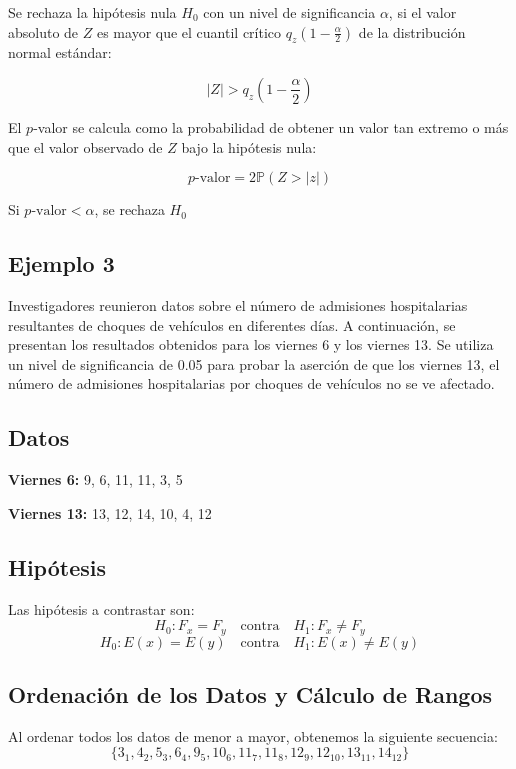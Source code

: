\documentclass{article}
\begin{document}
Se rechaza la hipótesis nula $H_0$ con un nivel de significancia $\alpha$, si el valor absoluto de $Z$ es mayor que el cuantil crítico $q_z(1-\frac{\alpha}{2})$ de la distribución normal estándar:

\[
    |Z| > q_z\left(1-\frac{\alpha}{2}\right)
\]

El $p$-valor se calcula como la probabilidad de obtener un valor tan extremo o más que el valor observado de $Z$ bajo la hipótesis nula:

\[
    p\text{-valor} = 2\mathbb{P}(Z > |z|)
\]

Si $p\text{-valor} < \alpha$, se rechaza $H_0$

\newpage

\subsection*{Ejemplo 3}

Investigadores reunieron datos sobre el número de admisiones hospitalarias resultantes de choques de vehículos en diferentes días. A continuación, se presentan los resultados obtenidos para los viernes 6 y los viernes 13. Se utiliza un nivel de significancia de 0.05 para probar la aserción de que los viernes 13, el número de admisiones hospitalarias por choques de vehículos no se ve afectado.

\subsection*{Datos}

\textbf{Viernes 6:} 9, 6, 11, 11, 3, 5

\textbf{Viernes 13:} 13, 12, 14, 10, 4, 12

\subsection*{Hipótesis}

Las hipótesis a contrastar son:
\[
    H_0: F_x = F_y \quad \text{contra} \quad H_1: F_x \neq F_y
\]
\[
    H_0: E(x) = E(y) \quad \text{contra} \quad H_1: E(x) \neq E(y)
\]

\subsection*{Ordenación de los Datos y Cálculo de Rangos}

Al ordenar todos los datos de menor a mayor, obtenemos la siguiente secuencia:
\[
    \{3_1, 4_2, 5_3, 6_4, 9_5, 10_6, 11_7, 11_8, 12_9, 12_{10}, 13_{11}, 14_{12}\}
\]
\end{document}
